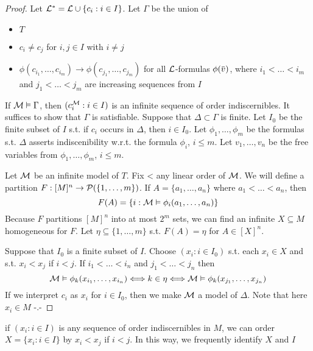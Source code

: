 \documentclass[11pt]{article}
\begin{document}
\begin{proof}
Let \(\mathcal{L}^*=\mathcal{L}\cup\{c_i:i\in I\}\). Let \(\Gamma\) be the union of
\begin{itemize}
\item \(T\)
\item \(c_i\neq c_j\) for \(i,j\in I\) with \(i\neq j\)
\item \(\phi(c_{i_1},\dots,c_{i_m})\to\phi(c_{j_1},\dots,c_{j_m})\) for all \(\mathcal{L}\)-formulas \(\phi(\barv)\),
where \(i_1<\dots<i_m\) and \(j_1<\dots<j_m\) are increasing sequences from \(I\)
\end{itemize}


If \(\mathcal{M}\vDash\Gamma\), then \((c_i^{\mathcal{M}}:i\in I)\) is an infinite sequence of order indiscernibles. It suffices
to show that \(\Gamma\) is satisfiable. Suppose that \(\Delta\subset\Gamma\) is finite. Let \(I_0\) be the finite subset
of \(I\) s.t. if \(c_i\) occurs in \(\Delta\), then \(i\in I_0\). Let \(\phi_1,\dots,\phi_m\) be the formulas s.t.
\(\Delta\) asserts indiscenibility w.r.t. the formula \(\phi_i\), \(i\le m\). Let \(v_1,\dots,v_n\) be the free
variables from \(\phi_1,\dots,\phi_m\), \(i\le m\).

 Let \(\mathcal{M}\) be an infinite model of \(T\). Fix < any linear order of \(\mathcal{M}\). We will define a
partition \(F:[M]^n\to\mathcal{P}(\{1,\dots,m\})\). If \(A=\{a_1,\dots,a_n\}\) where \(a_1<\dots<a_n\), then
\begin{equation*}
F(A)=\{i:\mathcal{M}\vDash\phi_i(a_1,\dots,a_n)\}
\end{equation*}
Because \(F\) partitions \([M]^n\) into at most \(2^m\) sets, we can find an
infinite \(X\subseteq M\) homogeneous for \(F\). Let \(\eta\subseteq\{1,\dots,m\}\) s.t. \(F(A)=\eta\) for \(A\in[X]^n\).

Suppose that \(I_0\) is a finite subset of \(I\). Choose \((x_i:i\in I_0)\) s.t. each \(x_i\in X\) and
s.t. \(x_i<x_j\) if \(i<j\). If \(i_1<\dots<i_n\) and \(j_1<\dots<j_n\) then
\begin{equation*}
\mathcal{M}\vDash\phi_k(x_{i_1},\dots,x_{i_n})\Longleftrightarrow k\in\eta\Longleftrightarrow\mathcal{M}\vDash\phi_k(x_{j_1},\dots,x_{j_n})
\end{equation*}
If we interpret \(c_i\) as \(x_i\) for \(i\in I_0\), then we make \(\mathcal{M}\) a model of \(\Delta\). Note that
here \(x_i\in M\) -.-
\end{proof}

if \((x_i:i\in I)\) is any sequence of order indiscernibles in \(M\), we can order \(X=\{x_i:i\in I\}\)
by \(x_i<x_j\) if \(i<j\). In this way, we frequently identify \(X\) and \(I\)
\end{document}
